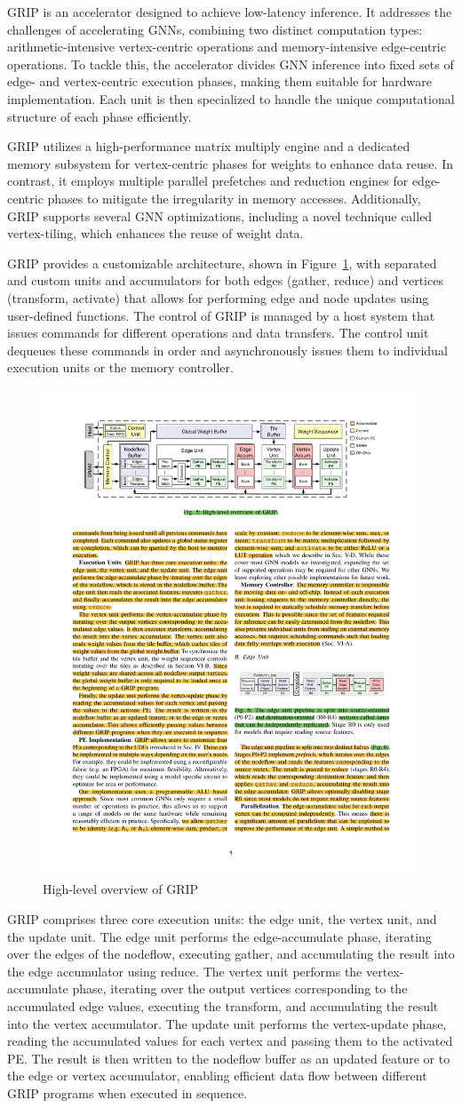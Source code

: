 GRIP is an accelerator designed to achieve low-latency inference.
It addresses the challenges of accelerating GNNs, combining two distinct computation types: arithmetic-intensive vertex-centric operations and memory-intensive edge-centric operations.
To tackle this, the accelerator divides GNN inference into fixed sets of edge- and vertex-centric execution phases, making them suitable for hardware implementation.
Each unit is then specialized to handle the unique computational structure of each phase efficiently.

GRIP utilizes a high-performance matrix multiply engine and a dedicated memory subsystem for vertex-centric phases for weights to enhance data reuse.
In contrast, it employs multiple parallel prefetches and reduction engines for edge-centric phases to mitigate the irregularity in memory accesses.
Additionally, GRIP supports several GNN optimizations, including a novel technique called vertex-tiling, which enhances the reuse of weight data.

GRIP provides a customizable architecture, shown in Figure~\ref{fig:grip_architecture}, with separated and custom units and accumulators for both edges (gather, reduce) and vertices (transform, activate) that allows for performing edge and node updates using user-defined functions.
The control of GRIP is managed by a host system that issues commands for different operations and data transfers.
The control unit dequeues these commands in order and asynchronously issues them to individual execution units or the memory controller.

\begin{figure}[t]
    \centering
    \includegraphics[height=0.26\textwidth]{Images/GRIP_architecture}
    \caption{High-level overview of GRIP~\cite{DBLP:journals/corr/abs-2007-13828}}
    \label{fig:grip_architecture}
\end{figure}

GRIP comprises three core execution units: the edge unit, the vertex unit, and the update unit.
The edge unit performs the edge-accumulate phase, iterating over the edges of the nodeflow, executing gather, and accumulating the result into the edge accumulator using reduce.
The vertex unit performs the vertex-accumulate phase, iterating over the output vertices corresponding to the accumulated edge values, executing the transform, and accumulating the result into the vertex accumulator.
The update unit performs the vertex-update phase, reading the accumulated values for each vertex and passing them to the activated PE.
The result is then written to the nodeflow buffer as an updated feature or to the edge or vertex accumulator, enabling efficient data flow between different GRIP programs when executed in sequence.

